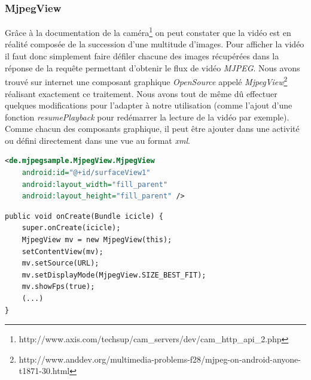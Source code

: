 \subsubsection{MjpegView}
Grâce à la documentation de la caméra\footnote{\label{docAxis}
http://www.axis.com/techsup/cam\_servers/dev/cam\_http\_api\_2.php} on peut
constater que la vidéo est en réalité composée de la succession d'une multitude
d'images. Pour afficher la vidéo il faut donc simplement faire défiler chacune
des images récupérées dans la réponse de la requête permettant d'obtenir le flux de vidéo \textit{MJPEG}.
\newline
Nous avons trouvé sur internet une composant graphique \textit{OpenSource}
appelé \textit{MjpegView}\footnote{\label{MjpegView}
http://www.anddev.org/multimedia-problems-f28/mjpeg-on-android-anyone-t1871-30.html}
réalisant exactement ce traitement.
Nous avons tout de même dû effectuer quelques modifications pour l'adapter à
notre utilisation (comme l'ajout d'une fonction \textit{resumePlayback} pour
redémarrer la lecture de la vidéo par exemple).\newline
Comme chacun des composants graphique, il peut être ajouter dans une activité ou
défini directement dans une vue au format \textit{xml}.\newline
\begin{center}
\begin{lstlisting}[language=XML, format=XML, caption={video.xml}]
<de.mjpegsample.MjpegView.MjpegView
	android:id="@+id/surfaceView1"
	android:layout_width="fill_parent"
	android:layout_height="fill_parent" />
\end{lstlisting}
\end{center}
\begin{center}
\begin{lstlisting}[caption={mjpegViewer.java}] 
public void onCreate(Bundle icicle) {
	super.onCreate(icicle);
	MjpegView mv = new MjpegView(this);
	setContentView(mv);
	mv.setSource(URL);
	mv.setDisplayMode(MjpegView.SIZE_BEST_FIT);
	mv.showFps(true);
	(...)
}
\end{lstlisting}
\end{center}


